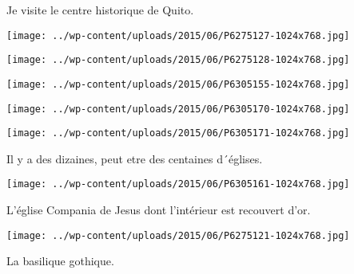  

 Je visite le centre historique de Quito. 

 

\begin{center} \texttt{[image: ../wp-content/uploads/2015/06/P6275127-1024x768.jpg]} \end{center}

 

 

\begin{center} \texttt{[image: ../wp-content/uploads/2015/06/P6275128-1024x768.jpg]} \end{center}

 

 

\begin{center} \texttt{[image: ../wp-content/uploads/2015/06/P6305155-1024x768.jpg]} \end{center}

 

 

\begin{center} \texttt{[image: ../wp-content/uploads/2015/06/P6305170-1024x768.jpg]} \end{center}

 

 

\begin{center} \texttt{[image: ../wp-content/uploads/2015/06/P6305171-1024x768.jpg]} \end{center}

 

 Il y a des dizaines, peut etre des centaines d´églises. 

 

\begin{center} \texttt{[image: ../wp-content/uploads/2015/06/P6305161-1024x768.jpg]} \end{center}

 

 L'église Compania de Jesus dont l'intérieur est recouvert d'or. 

 

\begin{center} \texttt{[image: ../wp-content/uploads/2015/06/P6275121-1024x768.jpg]} \end{center}

 

 La basilique gothique. 


